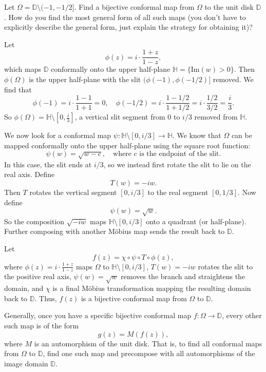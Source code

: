 \documentclass[12pt]{article}
\begin{document}
\begin{statement}[3]
    Let $\Omega = \mathbb{D} \setminus (-1, -1/2]$. Find a bijective conformal map from $\Omega$ to the unit disk $\mathbb{D}$. How do you find the most general form of all such maps (you don’t have to explicitly describe the general form, just explain the strategy for obtaining it)?
\end{statement}
\begin{newproof}
    Let
    $$ \phi(z) = i \cdot \frac{1 + z}{1 - z}, $$
    which maps $\mathbb{D}$ conformally onto the upper half-plane $\mathbb{H} = \{ \text{Im}(w) > 0 \}$. Then $\phi(\Omega)$ is the upper half-plane with the slit $(\phi(-1), \phi(-1/2)]$ removed. We find that
    $$ \phi(-1) = i \cdot \frac{1 - 1}{1 + 1} = 0, \quad \phi(-1/2) = i \cdot \frac{1 - 1/2}{1 + 1/2} = i \cdot \frac{1/2}{3/2} = \frac{i}{3}. $$
    So $\phi(\Omega) = \mathbb{H} \setminus \left[0, \frac{i}{3}\right]$, a vertical slit segment from $0$ to $i/3$ removed from $\mathbb{H}$.
    \par We now look for a conformal map $\psi : \mathbb{H} \setminus [0, i/3] \to \mathbb{H}$. We know that $\Omega$ can be mapped conformally onto the upper half-plane using the square root function:
    $$ \psi(w) = \sqrt{w - c}, \quad \text{where } c \text{ is the endpoint of the slit}. $$
    In this case, the slit ends at $i/3$, so we instead first rotate the slit to lie on the real axis. Define
    $$ T(w) = -iw. $$
    Then $T$ rotates the vertical segment $[0, i/3]$ to the real segment $[0, 1/3]$. Now define
    $$ \psi(w) = \sqrt{w}. $$
    So the composition $\sqrt{-iw}$ maps $\mathbb{H} \setminus [0, i/3]$ onto a quadrant (or half-plane). Further composing with another Möbius map sends the result back to $\mathbb{D}$.
    \par Let
    $$ f(z) = \chi \circ \psi \circ T \circ \phi(z), $$
    where $\phi(z) = i \cdot \frac{1 + z}{1 - z}$ maps $\Omega$ to $\mathbb{H} \setminus [0, i/3]$, $T(w) = -iw$ rotates the slit to the positive real axis, $\psi(w) = \sqrt{w}$ removes the branch and straightens the domain, and $\chi$ is a final Möbius transformation mapping the resulting domain back to $\mathbb{D}$. Thus, $f(z)$ is a bijective conformal map from $\Omega$ to $\mathbb{D}$.
    \par Generally, once you have a specific bijective conformal map $f : \Omega \to \mathbb{D}$, every other such map is of the form
    $$ g(z) = M(f(z)), $$
    where $M$ is an automorphism of the unit disk. That is, to find all conformal maps from $\Omega$ to $\mathbb{D}$, find one such map and precompose with all automorphisms of the image domain $\mathbb{D}$.
\end{newproof}
\end{document}
